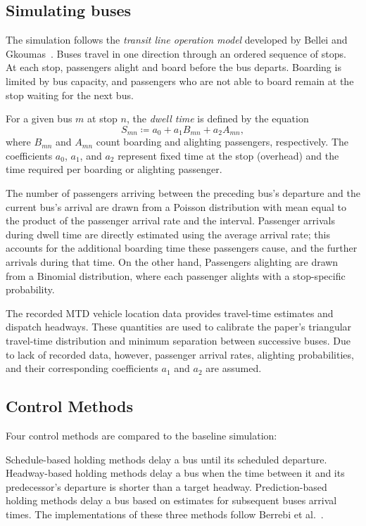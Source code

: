 \documentclass[conference]{IEEEtran}
\begin{document}
\subsection{Simulating buses}

The simulation follows the \emph{transit line operation model} developed by Bellei and Gkoumas~\cite{bellei2010}.
Buses travel in one direction through an ordered sequence of stops.
At each stop, passengers alight and board before the bus departs.
Boarding is limited by bus capacity, and passengers who are not able to board remain at the stop waiting for the next bus.

For a given bus $m$ at stop $n$, the \emph{dwell time} is defined by the equation
\[
  S_{mn} \coloneq a_0 + a_1 B_{mn} + a_2 A_{mn},
\]
where $B_{mn}$ and $A_{mn}$ count boarding and alighting passengers, respectively.
The coefficients $a_0$, $a_1$, and $a_2$ represent fixed time at the stop (overhead) and the time required per boarding or alighting passenger.

The number of passengers arriving between the preceding bus's departure and the current bus's arrival are drawn from a Poisson distribution with mean equal to the product of the passenger arrival rate and the interval.
Passenger arrivals during dwell time are directly estimated using the average arrival rate; this accounts for the additional boarding time these passengers cause, and the further arrivals during that time.
On the other hand, Passengers alighting are drawn from a Binomial distribution, where each passenger alights with a stop-specific probability.

The recorded MTD vehicle location data provides travel-time estimates and dispatch headways.
These quantities are used to calibrate the paper's triangular travel-time distribution and minimum separation between successive buses.
Due to lack of recorded data, however, passenger arrival rates, alighting probabilities, and their corresponding coefficients $a_1$ and $a_2$ are assumed.

\subsection{Control Methods}

Four control methods are compared to the baseline simulation:

Schedule-based holding methods delay a bus until its scheduled departure.
Headway-based holding methods delay a bus when the time between it and its predecessor's departure is shorter than a target headway.
Prediction-based holding methods delay a bus based on estimates for subsequent buses arrival times.
The implementations of these three methods follow Berrebi et al.~\cite{berrebi2018holding}.
\end{document}

